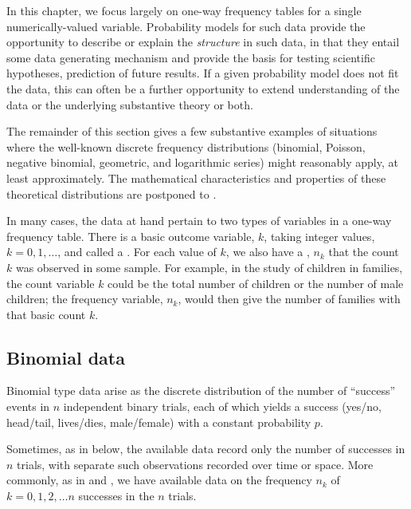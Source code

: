 \documentclass[11pt]{book}
\begin{document}
In this chapter, we focus largely on one-way frequency tables for a single 
numerically-valued variable.
Probability models for such data provide the opportunity to describe or explain
the \emph{structure} in such data, in that they entail some data generating 
mechanism and provide the basis for testing scientific hypotheses, prediction of
future results.  If a given probability model does not fit the data, this can often
be a further opportunity to extend understanding of the data or the underlying
substantive theory or both.

The remainder of this section gives a few substantive examples of situations where the 
well-known discrete frequency distributions (binomial, Poisson, negative binomial,
geometric, and logarithmic series) might reasonably apply, at least approximately.
The mathematical characteristics and properties of these theoretical
distributions are postponed to .

In many cases, the data at hand pertain to two types of variables in a one-way
frequency table. There is a basic outcome variable, $k$, taking integer values,
$k = 0, 1, \dots$, and called a .  For each value of $k$, we also have
a , $n_k$ that the count $k$ was observed in some sample.
For example, in the study of children in families, the count variable
$k$ could be the total number of children or the number of male children;
the frequency variable, $n_k$, would then give the number of families with that
basic count $k$.

\subsection{Binomial data}\label{sec:binom-data}
Binomial type data arise as the discrete distribution of the number of
``success'' events in $n$ independent binary trials, each of which 
yields a success (yes/no, head/tail, lives/dies, male/female) with a constant probability $p$. 

Sometimes, as in 
below, the available data record only the number of successes
in $n$ trials, with separate such observations recorded over
time or space.  More commonly, as in 
and ,
we have available data on the frequency $n_k$
of $k = 0, 1, 2, \dots n$ successes in the $n$ trials.
\end{document}
